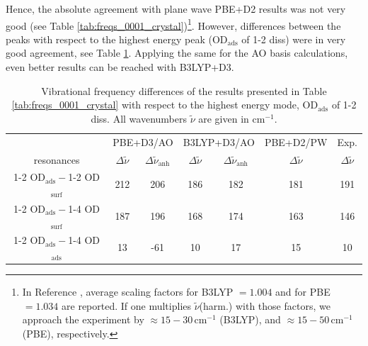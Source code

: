 \documentclass[11pt,DIV=13,BCOR=5mm,a4paper,headinclude]{scrbook}
\begin{document}
Hence, the absolute agreement with plane wave PBE+D2 results was not very good (see Table \ref{tab:freqs_0001_crystal})\footnote{In Reference \cite{Martin2015}, average scaling factors for B3LYP $=1.004$ and for PBE $=1.034$ are reported.
If one multiplies $\tilde{\nu}$(harm.) with those factors, we approach the experiment by $\approx 15-30\,$cm$^{-1}$ (B3LYP), and $\approx15-50\,$cm$^{-1}$ (PBE), respectively.}.
However, differences between the peaks with respect to the highest energy peak (OD$_\textrm{ads}$ of 1-2 diss) were in very good agreement, see Table \ref{tab:freqs_0001_crystal-relative}.
Applying the same for the AO basis calculations, even better results can be reached with B3LYP+D3.
\begin{table}[!h]
  \centering
  \caption{Vibrational frequency differences of the results presented in Table \ref{tab:freqs_0001_crystal} with respect to the highest energy mode, OD$_\textrm{ads}$ of 1-2 diss.
All wavenumbers $\tilde{\nu}$ are given in cm$^{-1}$.}
  \begin{tabular}{c|cc|cc|c|c}
  \toprule
   & \multicolumn{2}{c}{PBE+D3/AO} & \multicolumn{2}{c}{B3LYP+D3/AO} &PBE+D2/PW&Exp.\cite{Wirth2014}\\
   resonances & $\Delta\tilde{\nu}$ & $\Delta\tilde{\nu}_\textrm{anh}$ & $\Delta\tilde{\nu}$ & $\Delta\tilde{\nu}_\textrm{anh}$ & $\Delta\tilde{\nu}$ & $\Delta\tilde{\nu}$\\\midrule
  1-2 OD$_\textrm{ads}-$1-2 OD$_\textrm{surf}$&212 &206 &186 &182 &181 &191 \\
  1-2 OD$_\textrm{ads}-$1-4 OD$_\textrm{surf}$&187 &196 &168 &174 &163 &146 \\
  1-2 OD$_\textrm{ads}-$1-4 OD$_\textrm{ads}$ &13 &-61 &10 &17 &15 &10 \\\bottomrule
    \end{tabular}
  \label{tab:freqs_0001_crystal-relative}
\end{table}
\end{document}
